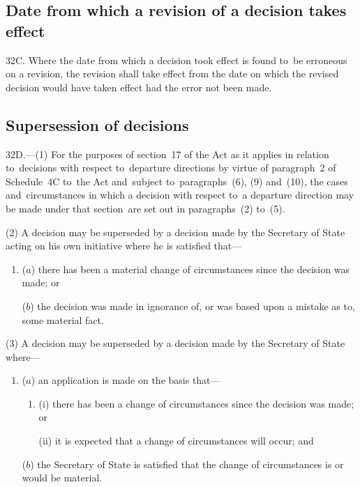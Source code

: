 \documentclass[12pt,a4paper]{article}
\begin{document}
\subsection[32C. Date from which a revision of a decision takes effect]{Date from which a revision of a decision takes effect}

32C.  Where the date from which a decision took effect is found to~be erroneous on a revision, the revision shall take effect from the date on which the revised decision would have taken effect had the error not been made.


\subsection[32D. Supersession of decisions]{Supersession of decisions}

32D.—(1) For the purposes of section~17 of the Act as it applies in relation to~decisions with respect to~departure directions by virtue of paragraph~2 of Schedule~4C to~the Act and~subject to~paragraphs~(6), (9) and~(10), the cases and~circumstances in which a decision with respect to~a departure direction may be made under that section~are set out in paragraphs~(2) to~(5).

(2) A decision may be superseded by a decision made by the Secretary of State acting on his own initiative where he is satisfied that---
\begin{enumerate}\item[]
($a$) there has been a material change of circumstances since the decision was made; or

($b$) the decision was made in ignorance of, or was based upon a mistake as to, some material fact.
\end{enumerate}

(3) A decision may be superseded by a decision made by the Secretary of State where---
\begin{enumerate}\item[]
($a$) an application is made on the basis that---
\begin{enumerate}\item[]
(i) there has been a change of circumstances since the decision was made; or

(ii) it is expected that a change of circumstances will occur; and
\end{enumerate}

($b$) the Secretary of State is satisfied that the change of circumstances is or would be material.
\end{enumerate}
\end{document}
